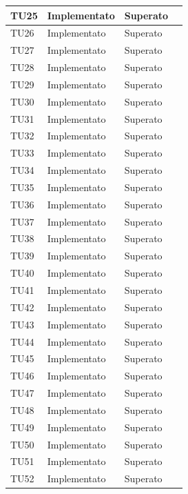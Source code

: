\begin{longtable}{|>{\centering\arraybackslash}m{1.6cm}|>{\centering\arraybackslash}m{6.41cm}|>{\centering\arraybackslash}m{3.1cm}| c |}
		\rowcolor{LightGray}
	TU25 & Implementato & Superato \\ \hline		
	TU26 & Implementato & Superato \\ \hline
		\rowcolor{LightGray}
	TU27 & Implementato & Superato  \\ \hline
	TU28 & Implementato & Superato  \\ \hline
		\rowcolor{LightGray}
	TU29 & Implementato & Superato  \\ \hline
	TU30 & Implementato & Superato  \\ \hline
		\rowcolor{LightGray}
	TU31 & Implementato & Superato  \\ \hline
	TU32 & Implementato & Superato  \\ \hline
		\rowcolor{LightGray}
	TU33 & Implementato & Superato  \\ \hline
	TU34 & Implementato & Superato  \\ \hline
		\rowcolor{LightGray}
	TU35 & Implementato & Superato \\ \hline
	TU36 & Implementato & Superato \\ \hline
		\rowcolor{LightGray}
	TU37 & Implementato & Superato  \\ \hline
	TU38 & Implementato & Superato  \\ \hline
		\rowcolor{LightGray}
	TU39 & Implementato & Superato  \\ \hline
	TU40 & Implementato & Superato  \\ \hline
		\rowcolor{LightGray}
	TU41 & Implementato & Superato  \\ \hline
	TU42 & Implementato & Superato  \\ \hline
		\rowcolor{LightGray}
	TU43 & Implementato & Superato  \\ \hline
	TU44 & Implementato & Superato  \\ \hline
		\rowcolor{LightGray}
	TU45 & Implementato & Superato  \\ \hline
	TU46 & Implementato & Superato  \\ \hline
		\rowcolor{LightGray}
	TU47 & Implementato & Superato  \\ \hline
	TU48 & Implementato & Superato  \\ \hline
		\rowcolor{LightGray}
	TU49 & Implementato & Superato  \\ \hline
	TU50 & Implementato & Superato  \\ \hline
		\rowcolor{LightGray}
	TU51 & Implementato & Superato  \\ \hline
	TU52 & Implementato & Superato  \\ \hline

\end{longtable}

